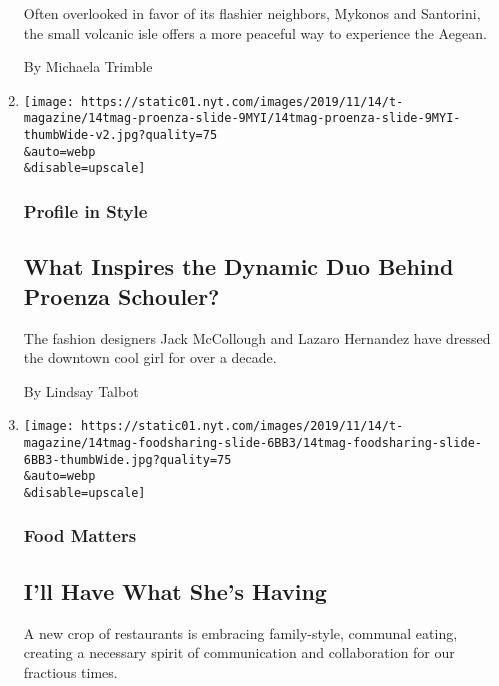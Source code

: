 \begin{enumerate}
  Often overlooked in favor of its flashier neighbors, Mykonos and
  Santorini, the small volcanic isle offers a more peaceful way to
  experience the Aegean.

  By Michaela Trimble
\item
  \href{/2019/11/13/t-magazine/proenza-schouler-inspiration.html}{}

  \texttt{[image: https://static01.nyt.com/images/2019/11/14/t-magazine/14tmag-proenza-slide-9MYI/14tmag-proenza-slide-9MYI-thumbWide-v2.jpg?quality=75\\\&auto=webp\\\&disable=upscale]}

  \hypertarget{profile-in-style}{%
  \subsubsection{Profile in Style}\label{profile-in-style}}

  \hypertarget{what-inspires-the-dynamic-duo-behind-proenza-schouler}{%
  \subsection{What Inspires the Dynamic Duo Behind Proenza
  Schouler?}\label{what-inspires-the-dynamic-duo-behind-proenza-schouler}}

  The fashion designers Jack McCollough and Lazaro Hernandez have
  dressed the downtown cool girl for over a decade.

  By Lindsay Talbot
\item
  \href{/2019/11/13/t-magazine/food-sharing-restaurants.html}{}

  \texttt{[image: https://static01.nyt.com/images/2019/11/14/t-magazine/14tmag-foodsharing-slide-6BB3/14tmag-foodsharing-slide-6BB3-thumbWide.jpg?quality=75\\\&auto=webp\\\&disable=upscale]}

  \hypertarget{food-matters}{%
  \subsubsection{Food Matters}\label{food-matters}}

  \hypertarget{ill-have-what-shes-having}{%
  \subsection{I'll Have What She's
  Having}\label{ill-have-what-shes-having}}

  A new crop of restaurants is embracing family-style, communal eating,
  creating a necessary spirit of communication and collaboration for our
  fractious times.


\end{enumerate}
